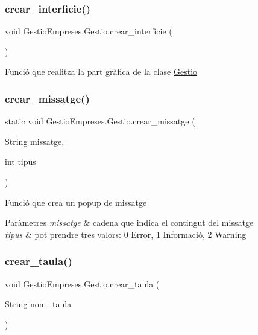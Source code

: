 \subsubsection{\texorpdfstring{crear\_interficie()}{crear\_interficie()}}
{\footnotesize\ttfamily void Gestio\+Empreses.\+Gestio.\+crear\+\_\+interficie (\begin{DoxyParamCaption}{ }\end{DoxyParamCaption})}

Funció que realitza la part gràfica de la clase \mbox{\hyperlink{class_gestio_empreses_1_1_gestio}{Gestio}} \mbox{\label{class_gestio_empreses_1_1_gestio_a38fd5f7b16dcdfcf9d6ab5fb2e71e607}} 
\subsubsection{\texorpdfstring{crear\_missatge()}{crear\_missatge()}}
{\footnotesize\ttfamily static void Gestio\+Empreses.\+Gestio.\+crear\+\_\+missatge (\begin{DoxyParamCaption}\item[{String}]{missatge,  }\item[{int}]{tipus }\end{DoxyParamCaption})\hspace{0.3cm}{\ttfamily [static]}}

Funció que crea un popup de missatge 
\begin{DoxyParams}{Paràmetres}
{\em missatge} & cadena que indica el contingut del missatge \\
\hline
{\em tipus} & pot prendre tres valors\+: 0 Error, 1 Informació, 2 Warning \\
\hline
\end{DoxyParams}
\mbox{\label{class_gestio_empreses_1_1_gestio_a172cc64fe5471a5e56a1a631842122ba}} 
\subsubsection{\texorpdfstring{crear\_taula()}{crear\_taula()}}
{\footnotesize\ttfamily void Gestio\+Empreses.\+Gestio.\+crear\+\_\+taula (\begin{DoxyParamCaption}\item[{String}]{nom\+\_\+taula }\end{DoxyParamCaption})}

